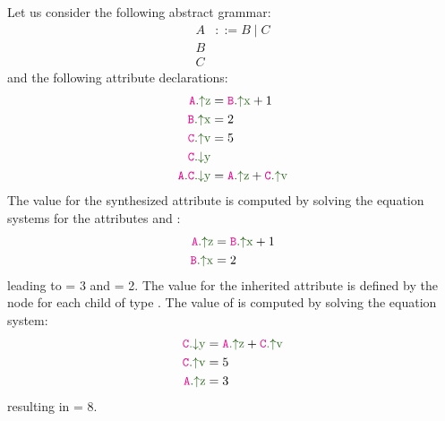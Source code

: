 Let us consider the following abstract grammar:
    \begin{align*}
        A& ::= B \mid C \\ 
        B& \\
        C&
    \end{align*}
and the following attribute declarations:
    \begin{align*}
        \Asyn{A}{z}& = \Asyn{B}{x} + 1 \\
        \Asyn{B}{x}& = 2 \\
        \Asyn{C}{v}& = 5 \\
        \Ainh{C}{y}& \\
        \Ainhdef{A}{C}{y}& = \Asyn{A}{z} + \Asyn{C}{v} \\
    \end{align*}
The value for the synthesized attribute  is computed by solving 
the equation systems for the attributes  and :
\begin{align*}
    \Asyn{A}{z} &= \Asyn{B}{x} + 1 \\
    \Asyn{B}{x} &= 2
\end{align*}
leading to  = 3 and  = 2.
The value for the inherited attribute  is defined by the node  for
each child of type . The value of  is computed by solving the equation system:
\begin{align*}
    \Ainh{C}{y} &= \Asyn{A}{z} + \Asyn{C}{v} \\
    \Asyn{C}{v} &= 5\\
    \Asyn{A}{z} &= 3
\end{align*}
resulting in  = 8.


